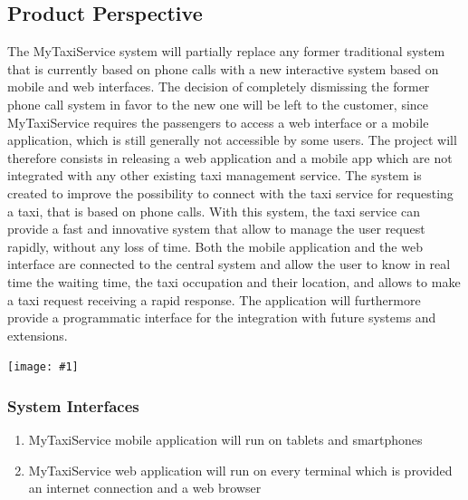 \documentclass[11pt, a4paper,titlepage]{article}
\newcommand{\productname}{MyTaxiService }
\newcommand{\image}[1]{
	\begin{center}
		\noindent \texttt{[image: \#1]}
	\end{center}
	}
\begin{document}
\subsection{Product Perspective}
The \productname system will partially replace any former traditional system that is currently based on phone calls with a new interactive system based on mobile and web interfaces. \newline
The decision of completely dismissing the former phone call system in favor to the new one will be left to the customer, since \productname requires the passengers to access a web interface or a mobile application, which is still generally not accessible by some users.
\newline
The project will therefore consists in releasing a web application and a mobile app which are not integrated with any other existing taxi management service.
The system is created to improve the possibility to connect with the taxi service for requesting a taxi, that is based on phone calls.
With this system, the taxi service can provide a fast and innovative system that allow to manage the user request rapidly, without any loss of time.
Both the mobile application and the web interface are connected to the central system and allow the user to know in real time the waiting time, the taxi occupation and their location, and allows to make a taxi request receiving a rapid response.
The application will furthermore provide a programmatic interface for the integration with future systems and extensions.
\newline

	\image{perspective_schema.png}

\pagebreak
\subsubsection{System Interfaces}
	\begin{enumerate}
		\item \productname mobile application will run on tablets and smartphones
		\item \productname web application will run on every terminal which is provided an internet connection and a web browser
	\end{enumerate}
\end{document}
